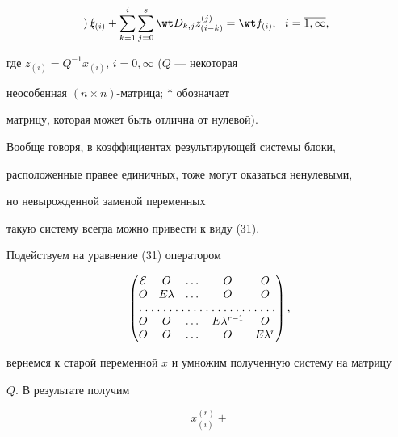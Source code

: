 \begin{pf}
\begin{multline}
\begin{pmatrix}
\end{pmatrix}


z_{(i)}+


\sum_{k=1}^{i}{


\sum_{j=0}^{s}{ \wt D_{k,j} z_{(i-k)}^{(j)}}}=


\wt f_{(i)}, \ \ i=\overline{1,\infty },


\end{multline}


где $z_{(i)}=Q^{-1}x_{(i)}$, $i=\overline{0, \infty}$ ($Q$ --- некоторая


неособенная $(n \times n)$-матрица; $\ast$ обозначает


матрицу, которая может быть отлична от нулевой).





Вообще говоря, в коэффициентах результирующей системы блоки,


расположенные правее единичных, тоже могут оказаться ненулевыми,


 но невырожденной заменой переменных


такую систему всегда можно привести к виду (31).





Подействуем на уравнение (31) оператором


$$


 \begin{pmatrix}


 \cal E & O & \dotsc & O & O\\


 O & E \lambda & \dotsc & O & O\\


\hdotsfor[1.5]{5}\\


 O & O & \dotsc & E \lambda^{r-1} & O\\


 O & O & \dotsc & O & E \lambda^r\\


\end{pmatrix},


$$


вернемся к старой переменной $x$ и умножим полученную систему на матрицу


$Q$. В результате получим


\begin{equation}


x_{(i)}^{(r)}+



\end{equation}
\end{pf}
